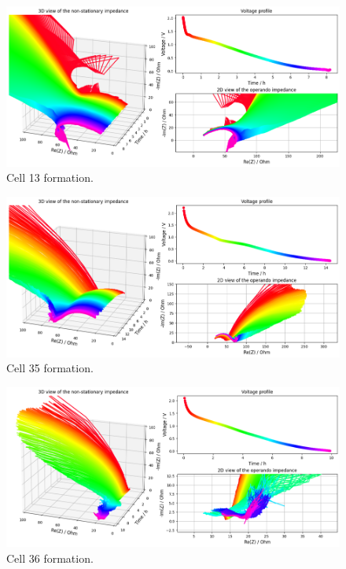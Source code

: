 \begin{figure}[h]
    \centering
    \includegraphics[width=\linewidth]{figures/application3/image16.png}
    \caption{Cell 13 formation.}
    \label{fig:cell13_formation}
\end{figure}

\begin{figure}[h]
    \centering
    \includegraphics[width=\linewidth]{figures/application3/image17.png}
    \caption{Cell 35 formation.}
    \label{fig:cell35_formation}
\end{figure}

\begin{figure}[h]
    \centering
    \includegraphics[width=\linewidth]{figures/application3/image18.png}
    \caption{Cell 36 formation.}
    \label{fig:cell36_formation}
\end{figure}


